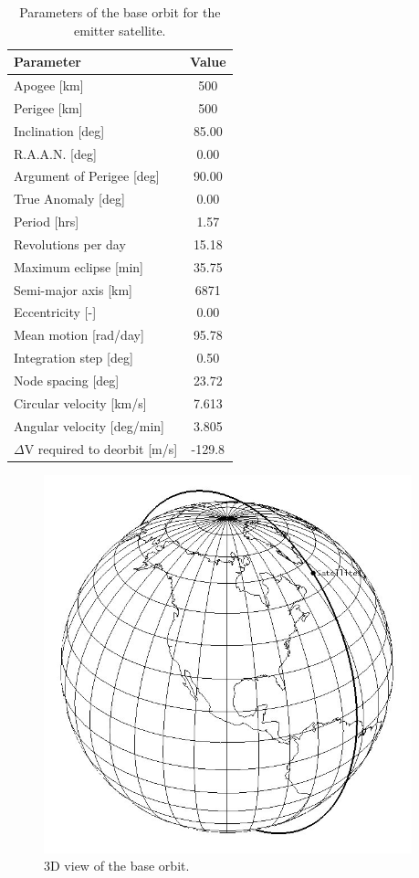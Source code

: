 \begin{table}
	\centering
		\begin{tabular}{p{5cm}|c}
		\textbf{Parameter} & \textbf{Value} \\ \hline \hline
		Apogee [km] & 500 \\
		Perigee [km] & 500 \\
		Inclination [deg] & 85.00 \\
		R.A.A.N. [deg] & 0.00 \\
		Argument of Perigee [deg] & 90.00 \\
		True Anomaly [deg] & 0.00 \\
		Period [hrs] & 1.57 \\
		Revolutions per day & 15.18 \\
		Maximum eclipse [min] & 35.75 \\
		Semi-major axis [km] & 6871 \\
		Eccentricity [-] & 0.00 \\
		Mean motion [rad/day] & 95.78 \\
		Integration step [deg] & 0.50 \\
		Node spacing [deg] & 23.72 \\
		Circular velocity [km/s] & 7.613 \\
		Angular velocity [deg/min] & 3.805 \\
		$\Delta$V required to deorbit [m/s] & -129.8 
		\end{tabular}
		\caption{Parameters of the base orbit for the emitter satellite.}
		\label{table:orbitParams}
\end{table}

\begin{figure}[h!]
\centering
\includegraphics[width=0.95\textwidth, angle=0]{chapters/img/finalOrbit.png}
\caption{3D view of the base orbit.}
\label{fig:finalOrbit}
\end{figure}  

